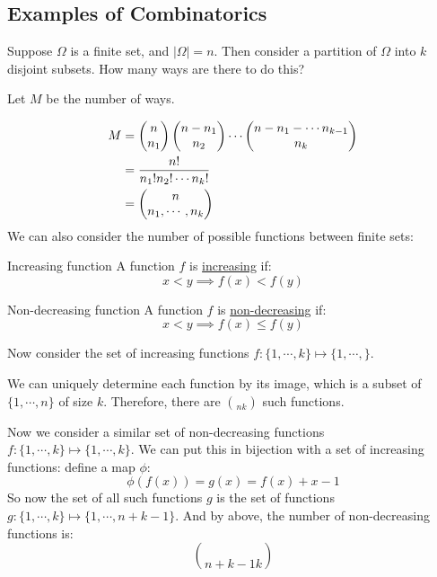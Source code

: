 \documentclass[../Main.tex]{subfiles}
\begin{document}
\subsection{Examples of Combinatorics}
Suppose $\Omega$ is a finite set, and $|\Omega| = n$. Then consider a partition of $\Omega$ into $k$ disjoint subsets. How many ways are there to do this?\par
Let $M$ be the number of ways.\par
\begin{align*}
    M &= \choose{n}{n_1} \choose{n - n_1}{n_2} \cdots \choose{n - n_1 - \cdots n_{k-1}}{n_k} \\
    &= \frac{n!}{n_1! n_2! \cdots n_k!} \\
    &= \choose{n}{n_1, \cdots, n_k}
\end{align*}
We can also consider the number of possible functions between finite sets:
\begin{definition}{Increasing function}
    A function $f$ is \underline{increasing} if:
    \begin{equation*}
        x < y \implies f(x) < f(y)
    \end{equation*}
\end{definition}
\begin{definition}{Non-decreasing function}
    A function $f$ is \underline{non-decreasing} if:
    \begin{equation*}
        x < y \implies f(x) \leq f(y)
    \end{equation*}
\end{definition}
Now consider the set of increasing functions $f : \{1, \cdots, k\} \mapsto \{1, \cdots, \}$.\par
We can uniquely determine each function by its image, which is a subset of $\{1, \cdots, n\}$ of size $k$. Therefore, there are $\choose{n}{k}$ such functions.\par
Now we consider a similar set of non-decreasing functions\\$f : \{1, \cdots, k\} \mapsto \{1, \cdots, k\}$. We can put this in bijection with a set of increasing functions: define a map $\phi$:
\begin{equation*}
    \phi(f(x)) = g(x) = f(x) + x - 1
\end{equation*}
So now the set of all such functions $g$ is the set of functions $g : \{1, \cdots, k\} \mapsto \{1, \cdots, n + k - 1\}$. And by above, the number of non-decreasing functions is:
\begin{equation*}
    \choose{n + k - 1}{k}
\end{equation*}
\end{document}
